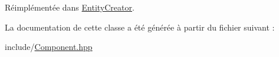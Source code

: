 Réimplémentée dans \hyperlink{classEntityCreator_aee1042f0ec1dc1310ab4c0096d09e094}{Entity\+Creator}.



La documentation de cette classe a été générée à partir du fichier suivant \+:\begin{DoxyCompactItemize}
\item 
include/\hyperlink{Component_8hpp}{Component.\+hpp}\end{DoxyCompactItemize}
